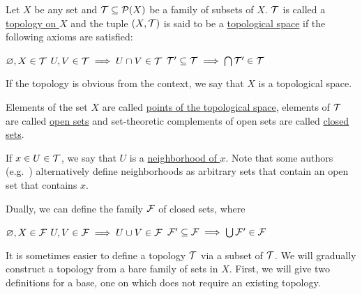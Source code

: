 \begin{definition}\label{def:topological_space}\cite[21]{Lectures:general_topology}
  Let $X$ be any set and $\mathcal T \subseteq \operatorname{\mathcal P}(X)$ be a family of subsets of $X$. $\mathcal T$ is called a \uline{topology on $X$} and the tuple $(X, \mathcal T)$ is said to be a \uline{topological space} if the following axioms are satisfied:
  \begin{description}
     $\varnothing, X \in \mathcal T$
     $U, V \in \mathcal T \implies U \cap V \in \mathcal T$
     $\mathcal T' \subseteq \mathcal T \implies \bigcap \mathcal T' \in \mathcal T$
  \end{description}

  If the topology is obvious from the context, we say that $X$ is a topological space.

  Elements of the set $X$ are called \uline{points of the topological space}, elements of $\mathcal T$ are called \uline{open sets} and set-theoretic complements of open sets are called \uline{closed sets}.

  If $x \in U \in \mathcal T$, we say that $U$ is a \uline{neighborhood of $x$}. Note that some authors (e.g.~\cite[38]{Kelley1955}) alternatively define neighborhoods as arbitrary sets that contain an open set that contains $x$.

  Dually, we can define the family $\mathcal F$ of closed sets, where
  \begin{description}
     $\varnothing, X \in \mathcal F$
     $U, V \in \mathcal F \implies U \cup V \in \mathcal F$
     $\mathcal F' \subseteq \mathcal F \implies \bigcup \mathcal F' \in \mathcal F$
  \end{description}
\end{definition}

It is sometimes easier to define a topology $\mathcal T$ via a subset of $\mathcal T$. We will gradually construct a topology from a bare family of sets in $X$. First, we will give two definitions for a base, one on which does not require an existing topology.


